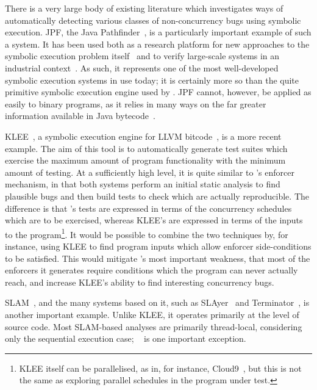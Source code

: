 There is a very large body of existing literature which investigates
ways of automatically detecting various classes of non-concurrency
bugs using symbolic execution.  JPF, the Java
Pathfinder~\cite{Havelund2000}, is a particularly important example of
such a system.  It has been used both as a research platform for new
approaches to the symbolic execution problem
itself~\cite{D'Amorim2008,Gligoric2010} and to verify large-scale
systems in an industrial context~\cite{PCZsCZreanu2008}.  As such, it
represents one of the most well-developed symbolic execution systems
in use today; it is certainly more so than the quite primitive
symbolic execution engine used by {\implementation}.  JPF cannot,
however, be applied as easily to binary programs, as it relies in many
ways on the far greater information available in Java
bytecode~\cite{Lindholm2013}.

KLEE~\cite{Cadar}, a symbolic execution engine for LLVM
bitcode~\cite{Lattner2013}, is a more recent example.  The aim of this
tool is to automatically generate test suites which exercise the
maximum amount of program functionality with the minimum amount of
testing.  At a sufficiently high level, it is quite similar to
{\technique}'s enforcer mechanism, in that both systems perform an
initial static analysis to find plausible bugs and then build tests to
check which are actually reproducible.  The difference is that
{\technique}'s tests are expressed in terms of the concurrency
schedules which are to be exercised, whereas KLEE's are expressed in
terms of the inputs to the program\footnote{KLEE itself can be
  parallelised, as in, for instance, Cloud9~\cite{Ciortea2010}, but
  this is not the same as exploring parallel schedules in the program
  under test.}\hspace{-.9ex}.  It would be possible to combine the two techniques
by, for instance, using KLEE to find program inputs which allow
{\technique} enforcer side-conditions to be satisfied.  This would
mitigate {\technique}'s most important weakness, that most of the
enforcers it generates require conditions which the program can never
actually reach, and increase KLEE's ability to find interesting
concurrency bugs.

SLAM~\cite{Ball2011}, and the many systems based on it, such as
SLAyer~\cite{Berdine2011} and Terminator~\cite{Cook2006a}, is another
important example.  Unlike KLEE, it operates primarily at the level of
source code.  Most SLAM-based analyses are primarily thread-local,
considering only the sequential execution case; ~\cite{Cook2007} is one
important exception.  

